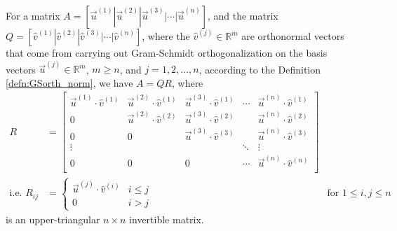 \begin{proper}
\label{proper:QRdecompose}
For a matrix $A = [\vec{u}^{(1)}|\vec{u}^{(2)}|\vec{u}^{(3)}|\cdots|\vec{u}^{(n)}]$, and the matrix $Q = [\hat{v}^{(1)}|\hat{v}^{(2)}|\hat{v}^{(3)}|\cdots|\hat{v}^{(n)}]$, where the $\hat{v}^{(j)} \in \mathbb{R}^m$ are orthonormal vectors that come from carrying out Gram-Schmidt orthogonalization on the basis vectors $\vec{u}^{(j)} \in \mathbb{R}^m$, $m \geq n$, and $j = 1,2,\ldots,n$, according to the Definition \ref{defn:GSorth_norm}, we have $A = QR$, where
\begin{align}
R &= 
\begin{bmatrix}
\vec{u}^{(1)} \cdot \hat{v}^{(1)} & \vec{u}^{(2)} \cdot \hat{v}^{(1)} & \vec{u}^{(3)} \cdot \hat{v}^{(1)} & \cdots & \vec{u}^{(n)} \cdot \hat{v}^{(1)} \\
0 & \vec{u}^{(2)} \cdot \hat{v}^{(2)} & \vec{u}^{(3)} \cdot \hat{v}^{(2)} &  & \vec{u}^{(n)} \cdot \hat{v}^{(2)} \\
0 & 0 & \vec{u}^{(3)} \cdot \hat{v}^{(3)} &  & \vec{u}^{(n)} \cdot \hat{v}^{(3)} \\
\vdots & & & \ddots & \vdots\\
0 & 0 & 0 & \cdots & \vec{u}^{(n)} \cdot \hat{v}^{(n)} \\
\end{bmatrix} \label{eqn:QRR} \\
\text{i.e.\ } R_{ij} &= 
\begin{cases}
\vec{u}^{(j)} \cdot \hat{v}^{(i)} & i \leq j \\
0 & i > j
\end{cases}
& \text{for $1 \leq i, j \leq n$} \nonumber
\end{align}
is an upper-triangular $n \times n$ invertible matrix.
\end{proper}

